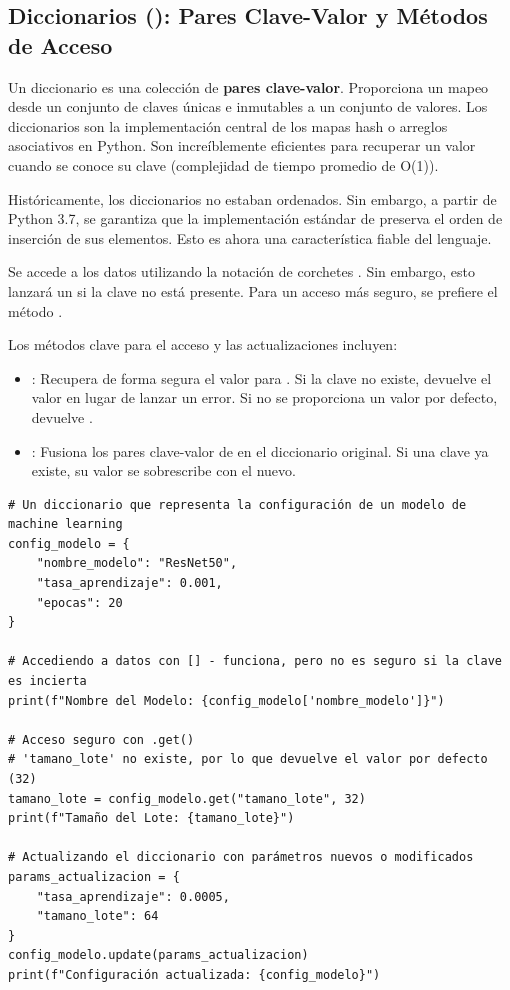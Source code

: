 \subsection{Diccionarios (): Pares Clave-Valor y Métodos de Acceso}
\label{subsec:dictionaries}
Un diccionario es una colección de \textbf{pares clave-valor}. Proporciona un mapeo desde un conjunto de claves únicas e inmutables a un conjunto de valores. Los diccionarios son la implementación central de los mapas hash o arreglos asociativos en Python. Son increíblemente eficientes para recuperar un valor cuando se conoce su clave (complejidad de tiempo promedio de O(1)).

\begin{remark}
Históricamente, los diccionarios no estaban ordenados. Sin embargo, a partir de Python 3.7, se garantiza que la implementación estándar de  preserva el orden de inserción de sus elementos. Esto es ahora una característica fiable del lenguaje.
\end{remark}

Se accede a los datos utilizando la notación de corchetes . Sin embargo, esto lanzará un  si la clave no está presente. Para un acceso más seguro, se prefiere el método .

Los métodos clave para el acceso y las actualizaciones incluyen:
\begin{itemize}
    \item \textbf{}: Recupera de forma segura el valor para . Si la clave no existe, devuelve el valor  en lugar de lanzar un error. Si no se proporciona un valor por defecto, devuelve .
    \item \textbf{}: Fusiona los pares clave-valor de  en el diccionario original. Si una clave ya existe, su valor se sobrescribe con el nuevo.
\end{itemize}

\begin{example}
\text{ }\begin{verbatim}
# Un diccionario que representa la configuración de un modelo de machine learning
config_modelo = {
    "nombre_modelo": "ResNet50",
    "tasa_aprendizaje": 0.001,
    "epocas": 20
}

# Accediendo a datos con [] - funciona, pero no es seguro si la clave es incierta
print(f"Nombre del Modelo: {config_modelo['nombre_modelo']}")

# Acceso seguro con .get()
# 'tamano_lote' no existe, por lo que devuelve el valor por defecto (32)
tamano_lote = config_modelo.get("tamano_lote", 32)
print(f"Tamaño del Lote: {tamano_lote}")

# Actualizando el diccionario con parámetros nuevos o modificados
params_actualizacion = {
    "tasa_aprendizaje": 0.0005,
    "tamano_lote": 64
}
config_modelo.update(params_actualizacion)
print(f"Configuración actualizada: {config_modelo}")
\end{verbatim}
\end{example}

